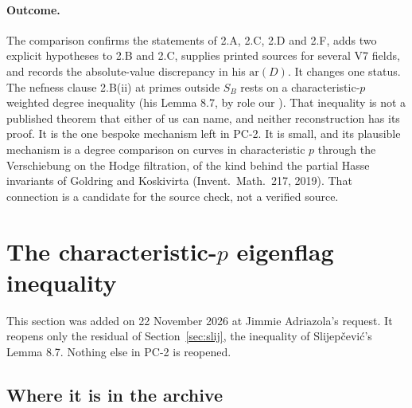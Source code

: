 \documentclass[11pt]{article}
\theoremstyle{remark}
\begin{document}
\paragraph{Outcome.} The comparison confirms the statements of 2.A, 2.C, 2.D and 2.F, adds two explicit hypotheses to 2.B and 2.C, supplies printed sources for several V7 fields, and records the absolute-value discrepancy in his $\mathrm{ar}(D)$. It changes one status. The nefness clause 2.B(ii) at primes outside $S_B$ rests on a characteristic-$p$ weighted degree inequality (his Lemma 8.7, by role our ). That inequality is not a published theorem that either of us can name, and neither reconstruction has its proof. It is the one bespoke mechanism left in PC-2. It is small, and its plausible mechanism is a degree comparison on curves in characteristic $p$ through the Verschiebung on the Hodge filtration, of the kind behind the partial Hasse invariants of Goldring and Koskivirta (Invent.\ Math.\ 217, 2019). That connection is a candidate for the source check, not a verified source.

\section{The characteristic-\texorpdfstring{$p$}{p} eigenflag inequality}\label{sec:l87}

This section was added on 22 November 2026 at Jimmie Adriazola's request. It reopens only the residual of Section~\ref{sec:slij}, the inequality of Slijepčević's Lemma 8.7. Nothing else in PC-2 is reopened.

\subsection{Where it is in the archive}
\end{document}
